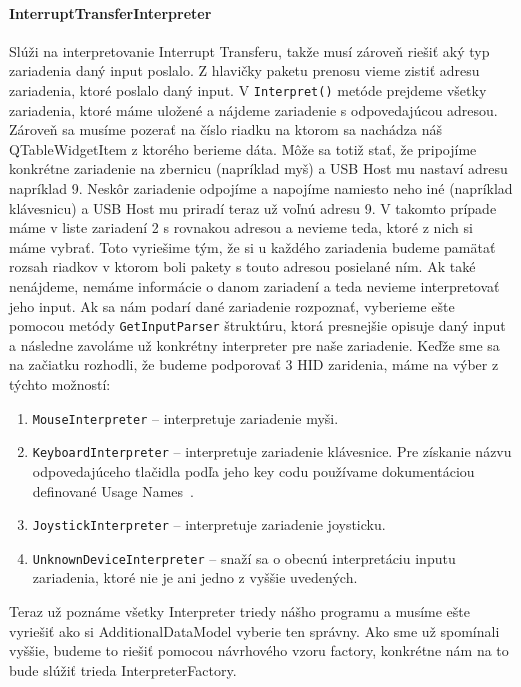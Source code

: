\paragraph{InterruptTransferInterpreter}
\hfill \break
Slúži na interpretovanie Interrupt Transferu, takže musí zároveň riešiť aký typ zariadenia daný input poslalo. Z hlavičky paketu prenosu vieme zistiť adresu zariadenia, ktoré poslalo daný input. V \texttt{Interpret()} metóde prejdeme všetky zariadenia, ktoré máme uložené a nájdeme zariadenie s odpovedajúcou adresou. Zároveň sa musíme pozerať na číslo riadku na ktorom sa nachádza náš QTableWidgetItem z ktorého berieme dáta. Môže sa totiž stať, že pripojíme konkrétne zariadenie na zbernicu (napríklad myš) a USB Host mu nastaví adresu napríklad 9. Neskôr zariadenie odpojíme a napojíme namiesto neho iné (napríklad klávesnicu) a USB Host mu priradí teraz už voľnú adresu 9. V takomto prípade máme v liste zariadení 2 s rovnakou adresou a nevieme teda, ktoré z nich si máme vybrať. Toto vyriešime tým, že si u každého zariadenia budeme pamätať rozsah riadkov v ktorom boli pakety s touto adresou posielané ním. Ak také nenájdeme, nemáme informácie o danom zariadení a teda nevieme interpretovať jeho input. Ak sa nám podarí dané zariadenie rozpoznať, vyberieme ešte pomocou metódy \texttt{GetInputParser} štruktúru, ktorá presnejšie opisuje daný input a následne zavoláme už konkrétny interpreter pre naše zariadenie. Keďže sme sa na začiatku rozhodli, že budeme podporovať 3 HID zaridenia, máme na výber z týchto možností:
\begin{enumerate}
\item \texttt{MouseInterpreter} -- interpretuje zariadenie myši.
\item \texttt{KeyboardInterpreter} -- interpretuje zariadenie klávesnice. Pre získanie názvu odpovedajúceho tlačidla podľa jeho key codu používame dokumentáciou definované Usage Names~\cite{keyboard_keycodes_names}.
\item \texttt{JoystickInterpreter} -- interpretuje zariadenie joysticku.
\item \texttt{UnknownDeviceInterpreter} -- snaží sa o obecnú interpretáciu inputu zariadenia, ktoré nie je ani jedno z vyššie uvedených.
\end{enumerate}

Teraz už poznáme všetky Interpreter triedy nášho programu a musíme ešte vyriešiť ako si AdditionalDataModel vyberie ten správny. Ako sme už spomínali vyššie, budeme to riešiť pomocou návrhového vzoru factory, konkrétne nám na to bude slúžiť trieda InterpreterFactory.

